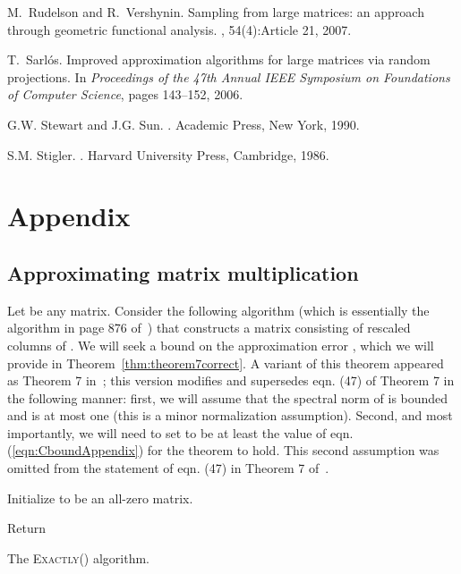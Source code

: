 \documentclass[11pt]{article}
\begin{document}
\begin{thebibliography}{10}
M.~Rudelson and R.~Vershynin.
\newblock Sampling from large matrices: an approach through geometric
  functional analysis.
, 54(4):Article 21, 2007.

T.~Sarl\'{o}s.
\newblock Improved approximation algorithms for large matrices via random
  projections.
\newblock In {\em Proceedings of the 47th Annual IEEE Symposium on Foundations
  of Computer Science}, pages 143--152, 2006.

G.W. Stewart and J.G. Sun.
.
\newblock Academic Press, New York, 1990.

S.M. Stigler.
.
\newblock Harvard University Press, Cambridge, 1986.

\end{thebibliography}
\section{Appendix}

\subsection{Approximating matrix multiplication}

Let  be any matrix. Consider the following algorithm (which is essentially the algorithm in page 876 of~\cite{DMM08_CURtheory_JRNL}) that constructs a matrix  consisting of  rescaled columns of . We will seek a bound on the approximation error , which we will provide in Theorem~\ref{thm:theorem7correct}. A variant of this theorem appeared as Theorem 7 in~\cite{DMM08_CURtheory_JRNL}; this version modifies and supersedes eqn. (47) of Theorem 7 in the following manner: first, we will assume that the spectral norm of  is bounded and is at most one (this is a minor normalization assumption). Second, and most importantly, we will need to set  to be at least the value of eqn. (\ref{eqn:CboundAppendix}) for the theorem to hold. This second assumption was omitted from the statement of eqn. (47) in Theorem 7 of~\cite{DMM08_CURtheory_JRNL}.

\begin{algorithm}
\begin{framed}

\SetLine


\AlgResult{

}

Initialize  to be an all-zero matrix.



Return \;

\end{framed}
\caption{
The \textsc{Exactly()} algorithm.
}
\label{alg:SDconstruct_exact}
\end{algorithm}
\end{document}
